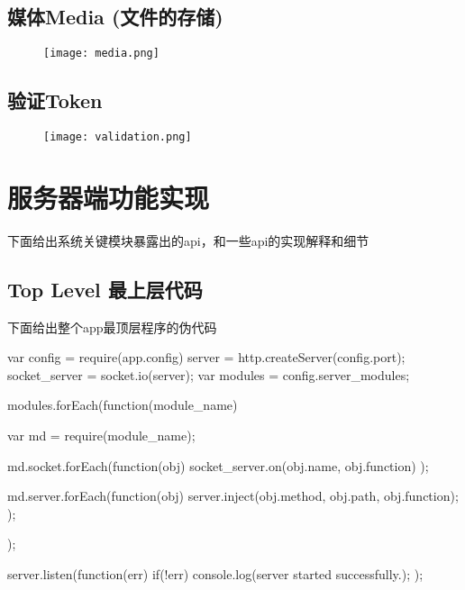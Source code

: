 \subsection{媒体Media (文件的存储)}

\begin{figure}[H]
	\centering
        \texttt{[image: media.png]}
	\label{fig:media-defined}
\end{figure}

\subsection{验证Token}

\begin{figure}[H]
	\centering
        \texttt{[image: validation.png]}
	\label{fig:validation-defined}
\end{figure}


\section{服务器端功能实现}

下面给出系统关键模块暴露出的api，和一些api的实现解释和细节

\subsection{Top Level 最上层代码}

下面给出整个app最顶层程序的伪代码


\hspace{1cm}
\begin{minipage}{1.0\linewidth}

\begin{Code}[label=index.js]
var config = require(app.config)
server = http.createServer(config.port);
socket_server = socket.io(server);
var modules  =  config.server_modules;

modules.forEach(function(module_name){
	var md = require(module_name);

	md.socket.forEach(function(obj){
		socket_server.on(obj.name, obj.function)
	});

	md.server.forEach(function(obj){
		server.inject(obj.method, obj.path, obj.function);
	});
});

server.listen(function(err){
	if(!err)
		console.log(server  started successfully.);
});
\end{Code}
\end{minipage}
\hspace{1cm}

